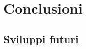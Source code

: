 \documentclass[12pt,a4paper,openright,twoside]{book}
\begin{document}
\chapter{Conclusioni}

\section{Sviluppi futuri}


\backmatter

\nocite{*} %



\end{document}

